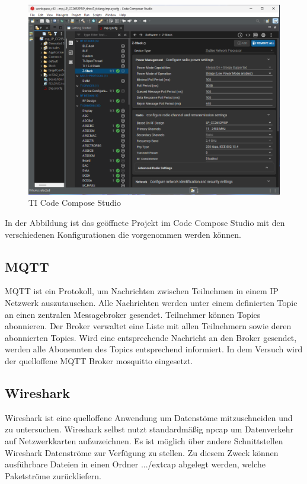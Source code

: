 \begin{figure}[H]
  \centering
  \includegraphics[width=1\textwidth]{media/cc-device.png}
  \caption{TI Code Compose Studio}
\end{figure}
In der Abbildung ist das geöffnete Projekt im Code Compose Studio mit den verschiedenen Konfigurationen die vorgenommen werden können.

\subsection{MQTT}

MQTT \cite{mqtt} ist ein Protokoll, um Nachrichten zwischen Teilnehmen in einem IP Netzwerk auszutauschen. Alle Nachrichten werden unter einem definierten Topic
an einen zentralen Messagebroker gesendet. Teilnehmer können Topics abonnieren. Der Broker verwaltet eine Liste mit allen Teilnehmern sowie 
deren abonnierten Topics. Wird eine entsprechende Nachricht an den Broker gesendet, werden alle Abonennten des Topics entsprechend informiert.
In dem Versuch wird der quelloffene MQTT Broker \grqq mosquitto\grqq{} eingesetzt. 

\subsection{Wireshark}

Wireshark ist eine quelloffene Anwendung um Datenstöme mitzuschneiden und zu untersuchen. Wireshark selbst nutzt standardmäßig \grqq npcap\grqq{} um Datenverkehr 
auf Netzwerkkarten aufzuzeichnen. Es ist möglich über andere Schnittstellen Wireshark Datenströme zur Verfügung zu stellen. Zu diesem Zweck
können ausführbare Dateien in einen Ordner \grqq .../extcap \grqq{} abgelegt werden, welche Paketströme zurückliefern. 

